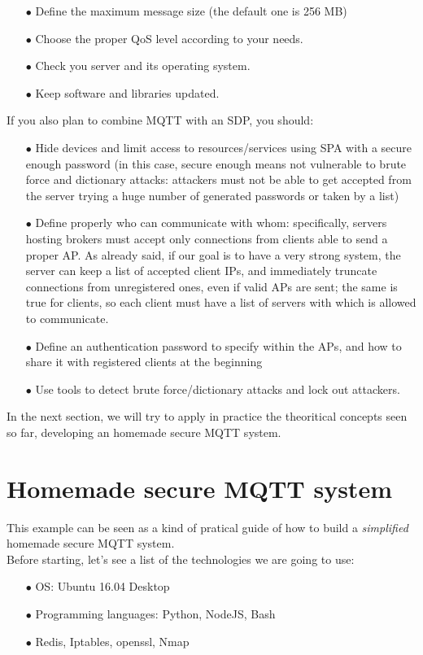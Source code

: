 \documentclass[12pt]{report}
\begin{document}
{{\begin{itemize}
There are many tools to automatize this mechanism, called load balancers and most of them are also able to detect unusually high traffic and block it.
\item[$\bullet$] Define the maximum message size (the default one is 256 MB)
\item[$\bullet$] Choose the proper QoS level according to your needs.
\item[$\bullet$] Check you server and its operating system.
\item[$\bullet$] Keep software and libraries updated.\\
\end{itemize}

If you also plan to combine MQTT with an SDP, you should:

\begin{itemize}
\setlength{\itemindent}{+4mm}
\item[$\bullet$] Hide devices and limit access to resources/services using SPA with a secure enough password (in this case, secure enough means not vulnerable to brute force and dictionary attacks: attackers must not be able to get accepted from the server trying a huge number of generated passwords or taken by a list)
\item[$\bullet$] Define properly who can communicate with whom: specifically, servers hosting brokers must accept only connections from clients able to send a proper AP. As already said, if our goal is to have a very strong system, the server can keep a list of accepted client IPs, and immediately truncate connections from unregistered ones, even if valid APs are sent; the same is true for clients, so each client must have a list of servers with which is allowed to communicate.
\item[$\bullet$] Define an authentication password to specify within the APs, and how to share it with registered clients at the beginning
\item[$\bullet$] Use tools to detect brute force/dictionary attacks and lock out attackers.
\end{itemize}

In the next section, we will try to apply in practice the theoritical concepts seen so far, developing an homemade secure MQTT system.\\

\section{Homemade secure MQTT system}
\bigskip
This example can be seen as a kind of pratical guide of how to build a \emph{simplified} homemade secure MQTT system.\\
Before starting, let's see a list of the technologies we are going to use:
\bigskip
\begin{itemize}
\setlength{\itemindent}{+4mm}
\item[$\bullet$] OS: Ubuntu 16.04 Desktop
\item[$\bullet$] Programming languages: Python, NodeJS, Bash
\item[$\bullet$] Redis, Iptables, openssl, Nmap\\
\end{itemize}

}}
\end{document}
